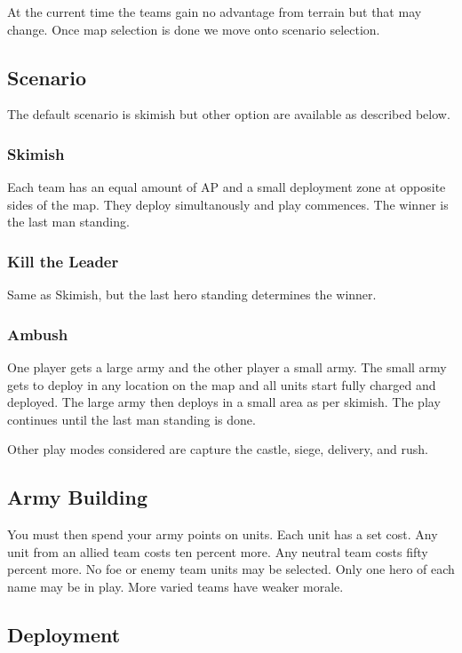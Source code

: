 \documentclass[a4paper,twocolumn]{article}
\begin{document}
At the current time the teams gain no advantage from terrain but that may change. Once map selection is done we move onto scenario selection.

\subsection{Scenario}

The default scenario is skimish but other option are available as described below.

\subsubsection{Skimish}

Each team has an equal amount of AP and a small deployment zone at opposite sides of the map. They deploy simultanously and play commences. The winner is the last man standing.

\subsubsection{Kill the Leader}

Same as Skimish, but the last hero standing determines the winner.

\subsubsection{Ambush}

One player gets a large army and the other player a small army. The small army gets to deploy in any location on the map and all units start fully charged and deployed. The large army then deploys in a small area as per skimish. The play continues until the last man standing is done.

Other play modes considered are capture the castle, siege, delivery, and rush.

\subsection{Army Building}

You must then spend your army points on units. Each unit has a set cost. Any unit from an allied team costs ten percent more. Any neutral team costs fifty percent more. No foe or enemy team units may be selected. Only one hero of each name may be in play. More varied teams have weaker morale.

\subsection{Deployment}
\end{document}
